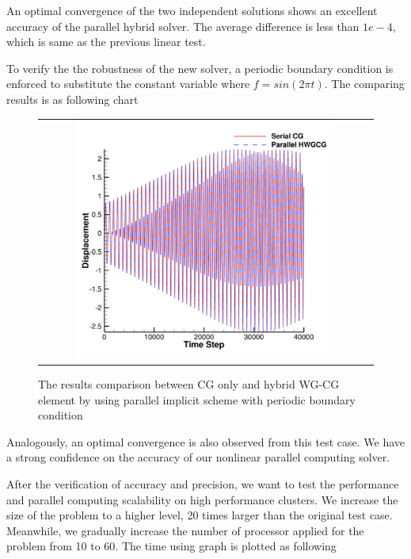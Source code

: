   An optimal convergence of the two independent solutions shows an excellent accuracy of the parallel hybrid solver. The average difference is less than $ 1e-4 $, which is same as the previous linear test.
  
  To verify the the robustness of the new solver, a periodic boundary condition is enforced to substitute the constant variable where $ f = sin (2 \pi t) $. The comparing results is as following chart
  
    \begin{figure}[H]
    	\centering
    	\begin{tabular}{c}
    		\includegraphics[width=0.8\textwidth]{./pics/result1d5.png}
    	\end{tabular}
    	\caption{\footnotesize The results comparison between CG only and hybrid WG-CG element by using parallel implicit scheme with periodic boundary condition}
    \end{figure}
    
    Analogously, an optimal convergence is also observed from this test case. We have a strong confidence on the accuracy of our nonlinear parallel computing solver. 
    
    After the verification of accuracy and precision, we want to test the performance and parallel computing scalability on high performance clusters. We increase the size of the problem to a higher level, 20 times larger than the original test case. Meanwhile, we gradually increase the number of processor applied for the problem from 10 to 60. The time using graph is plotted as following
    
